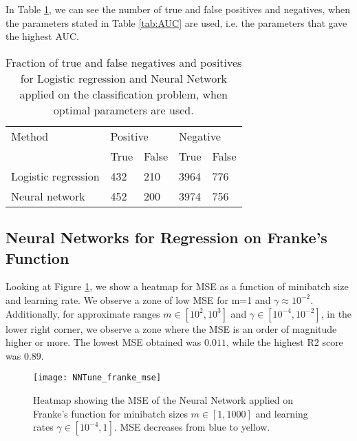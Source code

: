 In Table \ref{tab:confusion}, we can see the number of true and false positives and negatives, when the parameters stated in Table \ref{tab:AUC} are used, i.e. the parameters that gave the highest AUC.
\begin{table}[htbp]
	\centering
	\renewcommand{\arraystretch}{1.2}
	\caption{Fraction of true and false negatives and positives for Logistic regression and Neural Network applied on the classification problem, when optimal parameters are used.}
	\begin{tabular}{p{18mm} l l l l}
		\toprule
		Method & \multicolumn{2}{l}{Positive} & \multicolumn{2}{l}{Negative} \\
		\cline{2-3} \cline{4-5}
		& True & False & True & False \\
		\midrule
		Logistic \newline regression & 432 & 210 & 3964 & 776 \\
		Neural \newline network & 452 & 200 & 3974 & 756 \\
		\bottomrule
	\end{tabular}
	\label{tab:confusion}
\end{table}

\subsection{Neural Networks for Regression on Franke's Function}
Looking at Figure \ref{fig:TuneNN_mse}, we show a heatmap for MSE as a function of
minibatch size and learning rate. We observe a zone of low MSE for m=1 and $\gamma\approx 10^{-2}$.
Additionally, for approximate ranges $m\in[10^2, 10^3]$ and $\gamma\in[10^{-4}, 10^{-2}]$, in the lower right corner, we observe a zone where the MSE is an order of magnitude higher or more. The lowest MSE obtained was $0.011$, while the highest R2 score was $0.89$.
\begin{figure}[htbp]
	\centering
	\texttt{[image: NNTune\_franke\_mse]}
	\caption{Heatmap showing the MSE of the Neural Network applied on Franke's function for minibatch sizes $m\in[1, 1000]$ and learning rates $\gamma\in[10^{-4}, 1]$. MSE decreases from blue to yellow.}
	\label{fig:TuneNN_mse}
\end{figure}
